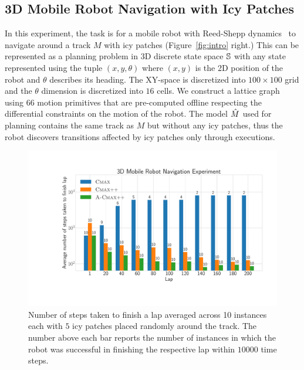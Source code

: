 \subsection{3D Mobile Robot Navigation with Icy Patches}
\label{sec:simulated-3d-mobile}

In this experiment, the task is for a mobile robot with Reed-Shepp
dynamics~\cite{reeds1990} to navigate around a track $M$ with icy
patches (Figure~\ref{fig:intro} right.) This
can be represented as a planning problem in 3D discrete state space
$\mathbb{S}$ with any state represented using the tuple $(x, y,
\theta)$ where $(x, y)$ is the 2D position of the robot and $\theta$
describes its heading. The XY-space is discretized into $100 \times
100$ grid and the $\theta$ dimension is discretized into $16$
cells. We construct a lattice
graph~\cite{DBLP:journals/jfr/PivtoraikoKK09} using $66$ motion
primitives that are pre-computed offline respecting the differential
constraints on the motion of the robot. The model $\hat{M}$ used for
planning contains the same track as $M$ but without any icy patches,
thus the robot discovers transitions affected by icy patches only
through executions.

\begin{figure}[t]
  \centering
  \includegraphics[width=0.9\linewidth]{figures/cmaxpp/car_racing_bar_add.pdf}
  \caption{Number of steps taken to finish a lap averaged across 10 instances each with $5$ icy patches placed randomly around the track. The number above each bar reports the number of instances in which the robot was successful in finishing the respective lap within $10000$ time steps.}
  \label{fig:car_racing}
\end{figure}

